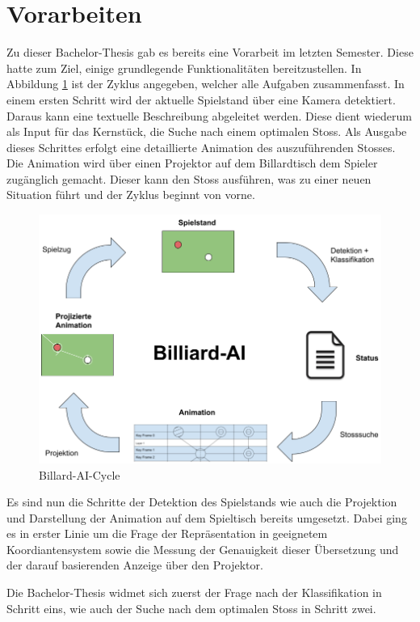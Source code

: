 \section{Vorarbeiten}\label{kap:vorarbeiten}
Zu dieser Bachelor-Thesis gab es bereits eine Vorarbeit im letzten Semester. Diese hatte zum Ziel, einige
grundlegende Funktionalitäten bereitzustellen. In Abbildung \ref{fig:billiard_ai_cycle} ist der Zyklus angegeben,
welcher alle Aufgaben zusammenfasst. In einem ersten Schritt wird der aktuelle Spielstand über eine Kamera detektiert.
Daraus kann eine textuelle Beschreibung abgeleitet werden. Diese dient wiederum als Input für das Kernstück, die Suche
nach einem optimalen Stoss. Als Ausgabe dieses Schrittes erfolgt eine detaillierte Animation des auszuführenden Stosses.
Die Animation wird über einen Projektor auf dem Billardtisch dem Spieler zugänglich gemacht. Dieser kann den Stoss ausführen,
was zu einer neuen Situation führt und der Zyklus beginnt von vorne.

\begin{figure}[h!]
    \begin{center}
        \includegraphics[width=0.8\linewidth]{../common/03_billiard_ai/resources/19_billiard_ai_cycle.png}
    \end{center}
    \caption{Billard-AI-Cycle}
    \label{fig:billiard_ai_cycle}
\end{figure}

Es sind nun die Schritte der Detektion des Spielstands wie auch die Projektion und Darstellung der Animation auf dem
Spieltisch bereits umgesetzt. Dabei ging es in erster Linie um die Frage der Repräsentation in geeignetem Koordiantensystem
sowie die Messung der Genauigkeit dieser Übersetzung und der darauf basierenden Anzeige über den Projektor.

Die Bachelor-Thesis widmet sich zuerst der Frage nach der Klassifikation in Schritt eins, wie auch der Suche
nach dem optimalen Stoss in Schritt zwei.